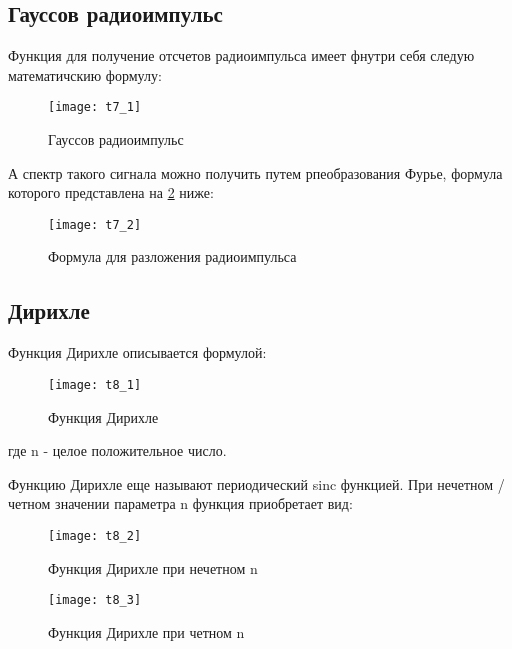 \subsection{Гауссов радиоимпульс}
Функция для получение отсчетов радиоимпульса имеет фнутри себя следую математичскию формулу:
\begin{figure}[H]
	\begin{center}
		\texttt{[image: t7\_1]}
		\caption{Гауссов радиоимпульс} 
		\label{pic:t7_1} %
	\end{center}
\end{figure}
А спектр такого сигнала можно получить путем рпеобразования Фурье, формула которого представлена на \ref{pic:t7_2} ниже:
\begin{figure}[H]
	\begin{center}
		\texttt{[image: t7\_2]}
		\caption{Формула для разложения радиоимпульса} 
		\label{pic:t7_2} %
	\end{center}
\end{figure}

\subsection{Дирихле}
Функция Дирихле описывается формулой:
\begin{figure}[H]
	\begin{center}
		\texttt{[image: t8\_1]}
		\caption{Функция Дирихле} 
		\label{pic:theor8_1} %
	\end{center}
\end{figure}
где n - целое положительное число.

Функцию Дирихле еще называют периодический sinc функцией.
При нечетном / четном значении параметра n функция приобретает вид:
\begin{figure}[H]
	\begin{center}
		\texttt{[image: t8\_2]}
		\caption{Функция Дирихле при нечетном n} 
		\label{pic:t8_2} %
	\end{center}
\end{figure}
\begin{figure}[H]
	\begin{center}
		\texttt{[image: t8\_3]}
		\caption{Функция Дирихле при четном n} 
		\label{pic:t8_3} %
	\end{center}
\end{figure}

